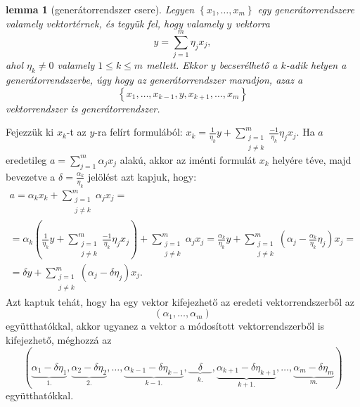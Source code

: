 \documentclass[a4paper, showtrims]{memoir}
\makeatletter
\renewenvironment{proof}[1][\proofname]
    {\par\pushQED{\qed}%
    \normalfont \topsep6\p@\@plus6\p@\relax
    \trivlist
    \item[\hskip\labelsep
        \itshape
    #1\@addpunct{:}]\ignorespaces}
    {\popQED\endtrivlist\@endpefalse}
\theoremstyle{plain}
\newtheorem{lemma}[proposition]{lemma}
\theoremstyle{remark}
\theoremstyle{definition}
\makeatother
\begin{document}
\begin{lemma}[generátorrendszer csere]\label{le:gencsere}
	Legyen $\left\{ x_1,\ldots,x_m \right\}$ egy generátorrendszere valamely vektortérnek,
	és tegyük fel, hogy valamely $y$ vektorra
	\[
		y=\sum_{j=1}^m\eta_jx_j,
	\]
	ahol $\eta_k\neq 0$ valamely $1\leq k\leq m$ mellett.
	Ekkor $y$ becserélhető a $k$-adik helyen a generátorrendszerbe,
	úgy hogy az generátorrendszer maradjon, azaz a
	\[
		\left\{ x_1,\ldots,x_{k-1},y,x_{k+1},\ldots,x_m \right\}
	\]
	vektorrendszer is generátorrendszer.
\end{lemma}
\begin{proof}
	Fejezzük ki $x_k$-t az $y$-ra felírt formulából:
	\(\displaystyle
	x_k=\frac{1}{\eta_k}y+\sum_{\substack{j=1\\j\neq k}}^m\frac{-1}{\eta_k}\eta_jx_j.
	\)
	Ha $a$ eredetileg
	\(\displaystyle
	a=\sum_{j=1}^m\alpha_jx_j
	\)
	alakú, akkor az iménti formulát $x_k$ helyére téve, majd
    bevezetve a
	$\delta=\frac{\alpha_k}{\eta_k}$ jelölést azt kapjuk, hogy:
	\begin{multline*}
		a=\alpha_kx_k+\sum_{\substack{j=1\\j\neq k}}^m\alpha_jx_j=
		\\
		=
		\alpha_k
		\left(
		\frac{1}{\eta_k}y+\sum_{\substack{j=1\\j\neq k}}^m\frac{-1}{\eta_k}\eta_jx_j
		\right)
		+\sum_{\substack{j=1\\j\neq k}}^m\alpha_jx_j
		=
		\frac{\alpha_k}{\eta_k}y+
		\sum_{\substack{j=1\\j\neq k}}^m\left( \alpha_j-\frac{\alpha_k}{\eta_k}\eta_j \right)x_j=
		\\
		=\delta y+
		\sum_{\substack{j=1\\j\neq k}}^m\left( \alpha_j-\delta\eta_j \right)x_j.
	\end{multline*}
	Azt kaptuk tehát, hogy ha egy vektor kifejezhető az eredeti vektorrendszerből az
	\[
		\left( \alpha_1,\ldots,\alpha_m \right)
	\]
	együtthatókkal, akkor ugyanez a vektor a módosított vektorrendszerből is kifejezhető,
	méghozzá az
	\[
		\left(
		\underbrace{\alpha_1-\delta\eta_1}_{1.},
		\underbrace{\alpha_2-\delta\eta_2}_{2.},
		\ldots,
		\underbrace{\alpha_{k-1}-\delta\eta_{k-1}}_{k-1.},
		\underbrace{\quad\delta\quad}_{k.},
		\underbrace{\alpha_{k+1}-\delta\eta_{k+1}}_{k+1.},
        \ldots,
		\underbrace{\alpha_m-\delta\eta_m}_{m.}
		\right)
	\]
	együtthatókkal.
\end{proof}
\end{document}
